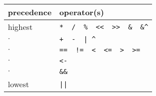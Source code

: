\begin{tabular}{ll}
\textbf{precedence} & \textbf{operator(s)} \\ \hline
highest   &	\verb!*  /  %  <<  >>  &  &^!		\\
 $\cdot$   &	\verb!+  -  | ^!			\\
 $\cdot$   &	\verb+==  !=  <  <=  >  >=+		\\
 $\cdot$   &	\verb!<-!				\\
 $\cdot$   &	\verb!&&!				\\
lowest    &	\verb!||!				\\
\end{tabular}
